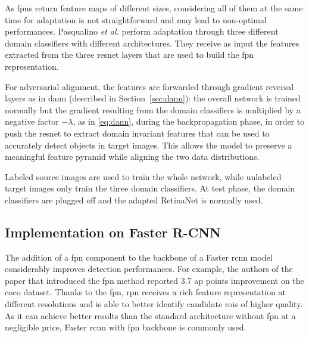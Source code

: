 \documentclass[%
    corpo=12pt,
    twoside,
    stile=classica,   
    tipotesi=magistrale,
    evenboxes,
    english,
	numerazioneromana,
]{toptesi}
\begin{document}
\bigskip
As \glspl{fpn} return feature maps of different sizes, considering all of them at the same time for adaptation is not straightforward and may lead to non-optimal performances. Pasqualino \textit{et al.}\cite{pasqualino2020unsupervised} perform adaptation through three different domain classifiers with different architectures. They receive as input the features extracted from the three \gls{resnet} layers that are used to build the \gls{fpn} representation.

For adversarial alignment, the features are forwarded through gradient reversal layers as in \gls{dann} (described in Section~\ref{sec:dann}): the overall network is trained normally but the gradient resulting from the domain classifiers is multiplied by a negative factor $-\lambda$, as in \eqref{eq:dann}, during the backpropagation phase, in order to push the \gls{resnet} to extract domain invariant features that can be used to accurately detect objects in target images. This allows the model to preserve a meaningful feature pyramid while aligning the two data distributions.

\medskip
Labeled source images are used to train the whole network, while unlabeled target images only train the three domain classifiers. At test phase, the domain classifiers are plugged off and the adapted RetinaNet is normally used.

\subsection{Implementation on Faster R-CNN}\label{sec:adapt_fpn_fasterrcnn}
The addition of a \gls{fpn} component to the backbone of a Faster \gls{rcnn} model considerably improves detection performances. For example, the authors of the paper that introduced the \gls{fpn} method reported 3.7 \gls{ap} points improvement on the \gls{coco} dataset\cite{lin2017feature}. Thanks to the \gls{fpn}, \gls{rpn} receives a rich feature representation at different resolutions and is able to better identify candidate \glspl{roi} of higher quality. As it can achieve better results than the standard architecture without \gls{fpn} at a negligible price, Faster \gls{rcnn} with \gls{fpn} backbone is commonly used. 
\end{document}

